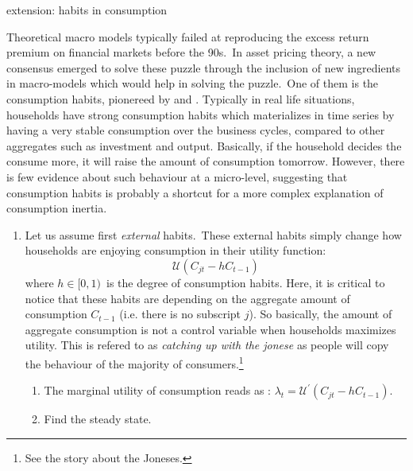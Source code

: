 \documentclass[a4paper,12pt]{article}%
\begin{document}
\begin{myexercise}{extension: habits in consumption}
%


Theoretical macro models typically failed at reproducing the excess return
premium on financial markets before the 90s.\ In asset pricing theory, a new
consensus emerged to solve these puzzle through the inclusion of new
ingredients in macro-models which would help in solving the puzzle.\ One of
them is the consumption habits, pionereed by \cite{constantinides1990habit}
and \cite{abel1990asset}. Typically in real life situations, households have
strong consumption habits which materializes in time series by having a very
stable consumption over the business cycles, compared to other aggregates such
as investment and output. Basically, if the household decides the consume
more, it will raise the amount of consumption tomorrow. However, there is few
evidence about such behaviour at a micro-level, suggesting that consumption
habits is probably a shortcut for a more complex explanation of consumption inertia.

\begin{enumerate}
\item Let us assume first \textit{external} habits.\ These external habits
simply change how households are enjoying consumption in their utility
function:%
\begin{equation}
\mathcal{U}\left(  C_{jt}-hC_{t-1}\right)
\end{equation}
where $h\in\lbrack0,1)$\ is the degree of consumption habits. Here, it is
critical to notice that these habits are depending on the aggregate amount of
consumption $C_{t-1}$ (i.e. there is no subscript $j$). So basically, the
amount of aggregate consumption is not a control variable when households
maximizes utility. This is refered to as \textit{catching up with the jonese}
as people will copy the behaviour of the majority of consumers.\footnote{See
\cite{abel1990asset} the story about the Joneses.}

\begin{enumerate}
\item The marginal utility of consumption reads as : $\lambda_{t}%
=\mathcal{U}^{\prime}\left(  C_{jt}-hC_{t-1}\right)  $.

\item Find the steady state.


\end{enumerate}
\end{enumerate}
\end{myexercise}
\end{document}
